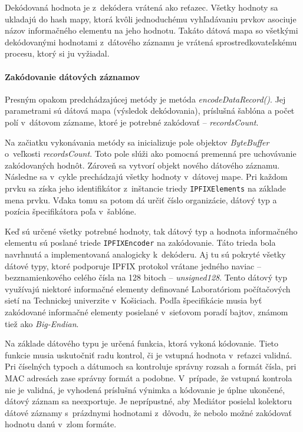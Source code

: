 Dekódovaná hodnota je z~dekódera vrátená ako reťazec. Všetky hodnoty sa ukladajú do hash mapy, ktorá 
kvôli jednoduchému vyhľadávaniu prvkov asociuje názov informačného elementu na jeho hodnotu. 
Takáto dátová mapa so všetkými dekódovanými hodnotami z~dátového záznamu je vrátená sprostredkovateľskému 
procesu, ktorý si ju vyžiadal.


\paragraph{Zakódovanie dátových záznamov} 
Presným opakom predchádzajúcej metódy je metóda \emph{encodeDataRecord()}. Jej parametrami sú dátová 
mapa (výsledok dekódovania), príslušná šablóna a počet polí v~dátovom zázname, ktoré je potrebné 
zakódovať -- \emph{recordsCount}.

Na začiatku vykonávania metódy sa inicializuje pole objektov \emph{ByteBuffer} o~veľkosti \emph{recordsCount}.
Toto pole slúži ako pomocná premenná pre uchovávanie zakódovaných hodnôt. Zároveň sa vytvorí objekt 
nového dátového záznamu.
Následne sa v~cykle prechádzajú všetky hodnoty v~dátovej mape. Pri každom prvku sa získa jeho identifikátor
z~inštancie triedy \verb|IPFIXElements| na základe mena prvku. Vďaka tomu sa potom dá určiť číslo
organizácie, dátový typ a pozícia špecifikátora poľa v~šablóne. 

Keď sú určené všetky potrebné hodnoty, tak dátový typ a hodnota informačného elementu sú poslané triede 
\verb|IPFIXEncoder| na zakódovanie. Táto trieda bola navrhnutá a implementovaná analogicky k~dekóderu. 
Aj tu sú pokryté všetky dátové typy, ktoré podporuje IPFIX protokol vrátane jedného naviac -- bezznamienkového
celého čísla na 128 bitoch -- \emph{unsigned128}. Tento dátový typ využívajú niektoré informačné elementy 
definované Laboratóriom počítačových sietí na Technickej univerzite v~Košiciach. Podľa špecifikácie
\citep{rfc5101} musia byť zakódované informačné elementy posielané v~sieťovom poradí bajtov, známom 
tiež ako \emph{Big-Endian}. 

Na základe dátového typu je určená funkcia, ktorá vykoná kódovanie. 
Tieto funkcie musia uskutočniť radu kontrol, či je vstupná hodnota v~reťazci validná. 
Pri číselných typoch a dátumoch sa kontroluje správny rozsah a formát čísla, pri MAC adresách zase 
správny formát a podobne.
V~prípade, že vstupná kontrola nie je validná, je vyhodená príslušná výnimka a 
kódovanie je úplne ukončené, dátový záznam sa neexportuje. Je neprípustné, aby Mediátor posielal kolektoru
dátové záznamy s~prázdnymi hodnotami z~dôvodu, že nebolo možné zakódovať hodnotu danú v~zlom formáte.  


